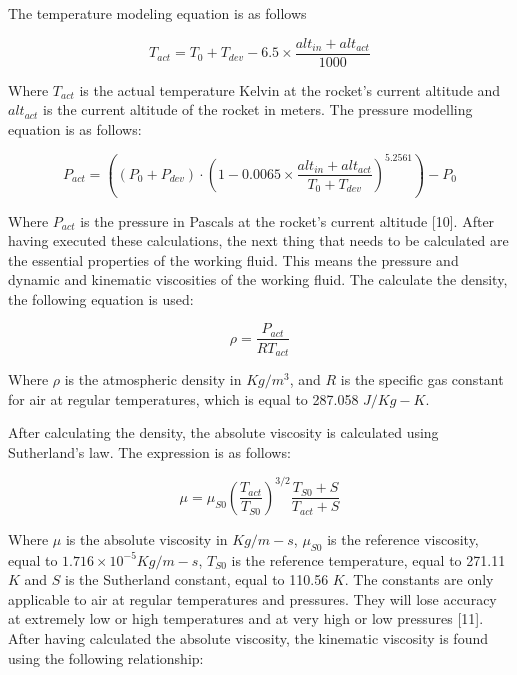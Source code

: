 \documentclass[]{article}
\begin{document}
The temperature modeling equation is as follows

\begin{equation}
T_{act} = T_0 + T_{dev} - 6.5 \times \dfrac{alt_{in} + alt_{act}}{1000}
\end{equation}

Where \(T_{act}\) is the actual temperature Kelvin at the rocket's
current altitude and \(alt_{act}\) is the current altitude of the rocket
in meters. The pressure modelling equation is as follows:

\begin{equation}
P_{act} = \left( \left(P_0+P_{dev} \right) \cdot \left( 1-0.0065 \times \dfrac{alt_{in}+alt_{act}}{T_0+T_{dev}} \right)^{5.2561}   \right) - P_0
\end{equation}

Where \(P_{act}\) is the pressure in Pascals at the rocket's current
altitude {[}10{]}. After having executed these calculations, the next
thing that needs to be calculated are the essential properties of the
working fluid. This means the pressure and dynamic and kinematic
viscosities of the working fluid. The calculate the density, the
following equation is used:

\begin{equation}
\rho = \dfrac{P_{act}} {RT_{act}}
\end{equation}

Where \(\rho\) is the atmospheric density in \(Kg/m^3\), and \(R\) is
the specific gas constant for air at regular temperatures, which is
equal to 287.058 \(J/Kg-K\).

After calculating the density, the absolute viscosity is calculated
using Sutherland's law. The expression is as follows:

\begin{equation}
\mu = \mu_{S0} \left( \dfrac{T_{act}}{T_{S0}}  \right)^{3/2} \dfrac{T_{S0}+S}{T_{act}+S}
\end{equation}

Where \(\mu\) is the absolute viscosity in \(Kg/m-s\), \(\mu_{S0}\) is
the reference viscosity, equal to \(1.716 \times 10^{-5} Kg/m-s\),
\(T_{S0}\) is the reference temperature, equal to 271.11 \(K\) and \(S\)
is the Sutherland constant, equal to 110.56 \(K\). The constants are
only applicable to air at regular temperatures and pressures. They will
lose accuracy at extremely low or high temperatures and at very high or
low pressures {[}11{]}. After having calculated the absolute viscosity,
the kinematic viscosity is found using the following relationship:
\end{document}
